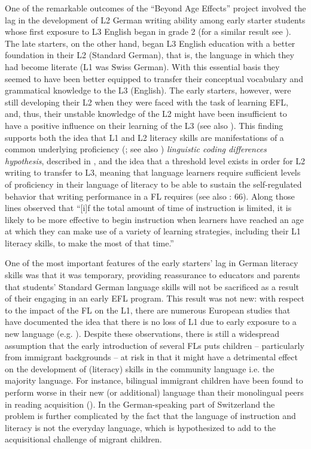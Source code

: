 \documentclass[output=paper,modfonts,nonflat,newtxmath]{langsci/langscibook}
\begin{document}
One of the remarkable outcomes of the “Beyond Age Effects” project involved the lag in the development of L2 German writing ability among early starter students whose first exposure to L3 English began in grade 2 (for a similar result see \citealt{Genesee2004}). The late starters, on the other hand, began L3 English education with a better foundation in their L2 (Standard German), that is, the language in which they had become literate (L1 was Swiss German). With this essential basis they seemed to have been better equipped to transfer their conceptual vocabulary and grammatical knowledge to the L3 (English). The early starters, however, were still developing their L2 when they were faced with the task of learning EFL, and, thus, their unstable knowledge of the L2 might have been insufficient to have a positive influence on their learning of the L3 (see also \citealt{Sánchez2012, Sánchez2015}). This finding supports both the idea that L1 and L2 literacy skills are manifestations of a common underlying proficiency (\citealt{Cummins1976, Cummins1981}; see also ) \textit{linguistic coding differences hypothesis}, described in \citet{Sparks2012}, and the idea that  a threshold level exists in order for L2 writing to transfer to L3, meaning that language learners require sufficient levels of proficiency in their language of literacy to be able to sustain the self-regulated behavior that writing performance in a FL requires (see also \citealt{SchoonenEtAl2011}: 66). Along those lines \citet[449]{Lightbown2000} observed that “[i]f the total amount of time of instruction is limited, it is likely to be more effective to begin instruction when learners have reached an age at which they can make use of a variety of learning strategies, including their L1 literacy skills, to make the most of that time.”

One of the most important features of the early starters’ lag in German literacy skills was that it was temporary, providing reassurance to educators and parents that students’ Standard German language skills will not be sacrificed as a result of their engaging in an early EFL program. This result was not new: with respect to the impact of the FL on the L1, there are numerous European studies that have documented the idea that there is no loss of L1 due to early exposure to a new language (e.g. \citealt{Goorhuis-BrouwerDeBot2010}). Despite these observations, there is still a widespread assumption that the early introduction of several FLs puts children – particularly from immigrant backgrounds – at risk in that it might have a detrimental effect on the development of (literacy) skills in the community language i.e. the majority language. For instance, bilingual immigrant children have been found to perform worse in their new (or additional) language than their monolingual peers in reading acquisition (\citealt{AugustHakuta1997, SlavinCheung2003}). In the German-speaking part of Switzerland the problem is further complicated by the fact that the language of instruction and literacy is not the everyday language, which is hypothesized to add to the acquisitional challenge of migrant children.
\end{document}
